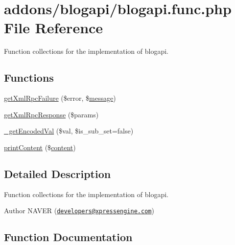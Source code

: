 \hypertarget{blogapi_8func_8php}{}\section{addons/blogapi/blogapi.func.\+php File Reference}
\label{blogapi_8func_8php}


Function collections for the implementation of blogapi.  


\subsection*{Functions}
\begin{DoxyCompactItemize}
\item 
\hyperlink{blogapi_8func_8php_a7e46f8d2f9b3c3115d176926b68b6b09}{get\+Xml\+Rpc\+Failure} (\$error, \$\hyperlink{classmessage}{message})
\item 
\hyperlink{blogapi_8func_8php_a18b93e72ecaae5fdfcfe1f0f107238f6}{get\+Xml\+Rpc\+Response} (\$params)
\item 
\hyperlink{blogapi_8func_8php_a1557492ae9fc007747ea06aad32948a0}{\+\_\+get\+Encoded\+Val} (\$val, \$is\+\_\+sub\+\_\+set=false)
\item 
\hyperlink{blogapi_8func_8php_aee14687cb1bc033360baef8b634ab27e}{print\+Content} (\$\hyperlink{classcontent}{content})
\end{DoxyCompactItemize}


\subsection{Detailed Description}
Function collections for the implementation of blogapi. 

\begin{DoxyAuthor}{Author}
N\+A\+V\+ER (\href{mailto:developers@xpressengine.com}{\tt developers@xpressengine.\+com}) 
\end{DoxyAuthor}


\subsection{Function Documentation}
\mbox{\label{blogapi_8func_8php_a1557492ae9fc007747ea06aad32948a0}} 
